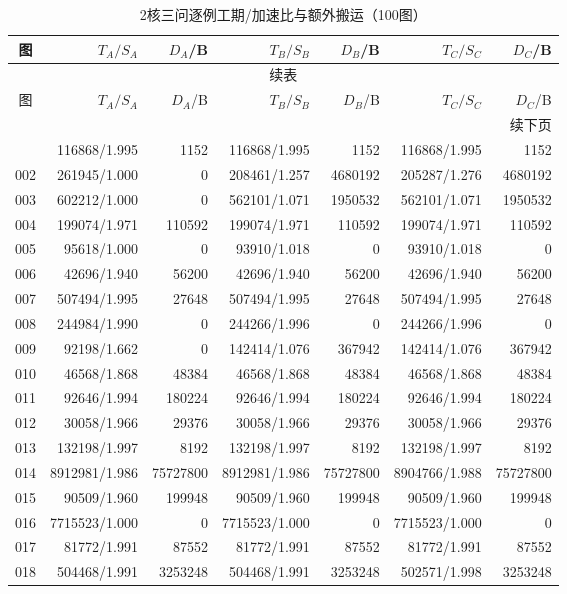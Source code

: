 \begin{longtable}{crrrrrr}
\caption{2核三问逐例工期/加速比与额外搬运（100图）}\label{tab:detail-2}\\
\toprule
图 & $T_A/S_A$ & $D_A$/B & $T_B/S_B$ & $D_B$/B & $T_C/S_C$ & $D_C$/B \\
\midrule
\endfirsthead
\multicolumn{7}{c}{续表}\\
\toprule
图 & $T_A/S_A$ & $D_A$/B & $T_B/S_B$ & $D_B$/B & $T_C/S_C$ & $D_C$/B \\
\midrule
\endhead
\midrule\multicolumn{7}{r}{续下页}\\
\endfoot
\bottomrule
\endlastfoot
001 & 116868/1.995 & 1152 & 116868/1.995 & 1152 & 116868/1.995 & 1152 \\
002 & 261945/1.000 & 0 & 208461/1.257 & 4680192 & 205287/1.276 & 4680192 \\
003 & 602212/1.000 & 0 & 562101/1.071 & 1950532 & 562101/1.071 & 1950532 \\
004 & 199074/1.971 & 110592 & 199074/1.971 & 110592 & 199074/1.971 & 110592 \\
005 & 95618/1.000 & 0 & 93910/1.018 & 0 & 93910/1.018 & 0 \\
006 & 42696/1.940 & 56200 & 42696/1.940 & 56200 & 42696/1.940 & 56200 \\
007 & 507494/1.995 & 27648 & 507494/1.995 & 27648 & 507494/1.995 & 27648 \\
008 & 244984/1.990 & 0 & 244266/1.996 & 0 & 244266/1.996 & 0 \\
009 & 92198/1.662 & 0 & 142414/1.076 & 367942 & 142414/1.076 & 367942 \\
010 & 46568/1.868 & 48384 & 46568/1.868 & 48384 & 46568/1.868 & 48384 \\
011 & 92646/1.994 & 180224 & 92646/1.994 & 180224 & 92646/1.994 & 180224 \\
012 & 30058/1.966 & 29376 & 30058/1.966 & 29376 & 30058/1.966 & 29376 \\
013 & 132198/1.997 & 8192 & 132198/1.997 & 8192 & 132198/1.997 & 8192 \\
014 & 8912981/1.986 & 75727800 & 8912981/1.986 & 75727800 & 8904766/1.988 & 75727800 \\
015 & 90509/1.960 & 199948 & 90509/1.960 & 199948 & 90509/1.960 & 199948 \\
016 & 7715523/1.000 & 0 & 7715523/1.000 & 0 & 7715523/1.000 & 0 \\
017 & 81772/1.991 & 87552 & 81772/1.991 & 87552 & 81772/1.991 & 87552 \\
018 & 504468/1.991 & 3253248 & 504468/1.991 & 3253248 & 502571/1.998 & 3253248 \\

\end{longtable}
